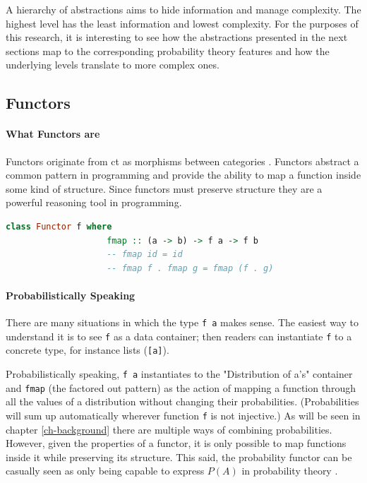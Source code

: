 \documentclass[
  oneside,
  11pt, a4paper,
  footinclude=true,
  headinclude=true,
  cleardoublepage=empty
]{scrbook}
\theoremstyle{definition}
\theoremstyle{definition}
\begin{document}
	A hierarchy of abstractions aims to hide information and manage complexity. The highest level has the least information and lowest complexity. For the purposes of this research, it is interesting to see how the abstractions presented in the next sections map to the corresponding probability theory features and how the underlying levels translate to more complex ones.
	
	    \subsection{Functors}
	    
	       \paragraph{What Functors are}
	        
	Functors originate from \gls{ct} as morphisms between categories \citep{Awodey:2010:CT:2060081}. Functors abstract a common pattern in programming and provide the ability to map a function inside some kind of structure. Since functors must preserve structure they are a powerful reasoning tool in programming.
	            
	            \begin{lstlisting}[mathescape, language=Haskell, caption={Functor laws},captionpos=b]
                class Functor f where
                    fmap :: (a -> b) -> f a -> f b
                    -- fmap id = id
                    -- fmap f . fmap g = fmap (f . g)
	            \end{lstlisting}{}
	            
	       \paragraph{Probabilistically Speaking}
	        
	There are many situations in which the type \texttt{f a} makes sense. The easiest way to understand it is to see \texttt{f} as a data container; then readers can instantiate \texttt{f} to a concrete type, for instance lists (\texttt{[a]}).
	           
	Probabilistically speaking, \texttt{f a} instantiates to the "Distribution of a's" container and \texttt{fmap} (the factored out pattern) as the action of mapping a function through all the values of a distribution without changing their probabilities. (Probabilities will sum up automatically wherever function \texttt{f} is not injective.) As will be seen in chapter \ref{ch-background} there are multiple ways of combining probabilities. However, given the properties of a functor, it is only possible to map functions inside it while preserving its structure. This said, the probability functor can be casually seen as only being capable to express $P(A)$ in probability theory \citep{jtobin}.
	
\end{document}
